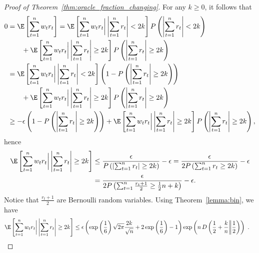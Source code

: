 \begin{proof}[Proof of Theorem~\ref{thm:oracle_fraction_changing}]
For any $k\geq 0$, it follows that
\begin{align*}
0&=\E\left[\sum_{t=1}^n w_t r_t \right] 
= \E\left[\sum_{t=1}^n w_t r_t \bigg| \left|\sum_{t=1}^n r_t \right|< 2 k\right] P\left(\left|\sum_{t=1}^n r_t\right|< 2k \right)\\
&\qquad+\E\left[\sum_{t=1}^n w_t r_t \bigg| \left|\sum_{t=1}^n r_t \right| \geq 2 k\right] P\left(\left|\sum_{t=1}^n r_t\right|\geq 2 k\right) \\
&=\E\left[\sum_{t=1}^n w_t r_t \bigg| \left|\sum_{t=1}^n r_t \right|< 2 k\right] \left(1-P\left(\left|\sum_{t=1}^n r_t\right|\geq 2 k\right)\right)\\
&\qquad+\E\left[\sum_{t=1}^n w_t r_t \bigg| \left|\sum_{t=1}^n r_t \right| \geq 2 k\right] P\left(\left|\sum_{t=1}^n r_t\right|\geq 2 k\right) \\
&\geq -\epsilon \left(1-P\left(\left|\sum_{t=1}^n r_t\right|\geq 2 k\right)\right)+\E\left[\sum_{t=1}^n w_t r_t \bigg| \left|\sum_{t=1}^n r_t\right| \geq 2 k\right] P\left(\left|\sum_{t=1}^n r_t \right|\geq 2 k\right),
\end{align*}
hence
\begin{align*}
\E\left[\sum_{t=1}^n w_t r_t \bigg| \left|\sum_{t=1}^n r_t\right| \geq 2 k\right]
&\leq \frac{\epsilon}{P\left(\left|\sum_{t=1}^n r_t\right|\geq 2 k\right)} -\epsilon
= \frac{\epsilon}{2 P\left(\sum_{t=1}^n r_t \geq 2 k\right)} -\epsilon\\
&= \frac{\epsilon}{2 P\left(\sum_{t=1}^n \frac{r_t + 1}{2} \geq \frac{1}{2}n+ k \right)}-\epsilon.
\end{align*}
Notice that $\frac{r_t + 1}{2}$ are Bernoulli random variables.
Using Theorem~\ref{lemma:bin}, we have
\begin{align*}
\E\left[\sum_{t=1}^n w_t r_t \bigg| \left|\sum_{t=1}^n r_t\right| \geq 2 k\right]
&\leq \epsilon \left(\exp\left(\frac{1}{6}\right)\sqrt{2 \pi}\frac{2k}{\sqrt{n}} +2\exp\left(\frac{1}{6}\right)-1\right)\exp\left(n \, D\left(\frac{1}{2}+\frac{k}{n}\middle\|\frac{1}{2}\right)\right)~. \qedhere
\end{align*}
\end{proof}


